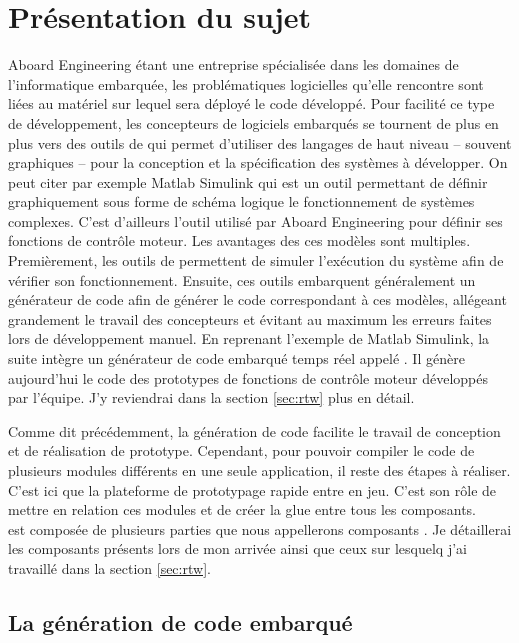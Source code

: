 \chapter{Présentation du sujet}
Aboard Engineering étant une entreprise spécialisée dans les domaines de
l'informatique embarquée, les problématiques logicielles qu'elle rencontre sont
liées au matériel sur lequel sera déployé le code développé. Pour facilité ce
type de développement, les concepteurs de logiciels embarqués se tournent de
plus en plus vers des outils de  qui permet d'utiliser des langages
de haut niveau -- souvent graphiques -- pour la conception et la spécification
des systèmes à développer. On peut citer par exemple Matlab\up{\circledR}
Simulink\up{\circledR} qui est un outil permettant de définir graphiquement sous
forme de schéma logique le fonctionnement de systèmes complexes. C'est
d'ailleurs l'outil utilisé par Aboard Engineering pour définir ses fonctions de
contrôle moteur. Les avantages des ces modèles sont multiples. Premièrement, les
outils de  permettent de simuler l'exécution du système afin de
vérifier son fonctionnement. Ensuite, ces outils embarquent généralement un
générateur de code afin de générer le code correspondant à ces modèles,
allégeant grandement le travail des concepteurs et évitant au maximum les
erreurs faites lors de développement \og manuel\fg{}. En reprenant l'exemple de
Matlab\up{\circledR} Simulink\up{\circledR}, la suite intègre un générateur de
code embarqué temps réel appelé . Il génère aujourd'hui le code des
prototypes de fonctions de contrôle moteur développés par l'équipe. J'y
reviendrai dans la section \ref{sec:rtw} plus en détail.

Comme dit précédemment, la génération de code facilite le travail de conception
et de réalisation de prototype. Cependant, pour pouvoir compiler le code de
plusieurs modules différents en une seule application, il reste des étapes à
réaliser. C'est ici que la plateforme de prototypage rapide 
entre en jeu. C'est son rôle de mettre en relation ces modules et de créer la
\og glue \fg{} entre tous les composants.\\
 est composée de plusieurs parties que nous appellerons \og
composants \fg{}. Je détaillerai les composants présents lors de mon arrivée
ainsi que ceux sur lesquelq j'ai travaillé dans la section \ref{sec:rtw}.

\section{La génération de code embarqué}
